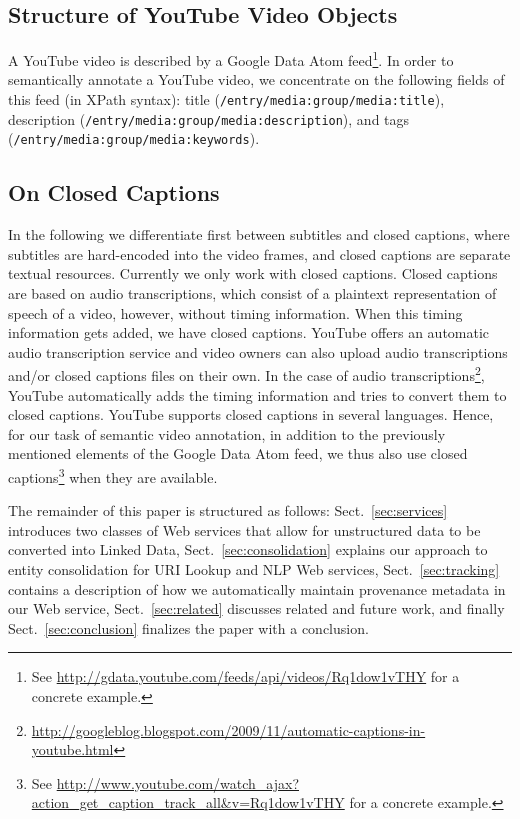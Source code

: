\documentclass{acm_proc_article-sp}
\begin{document}
\subsection{Structure of YouTube Video Objects}\label{sec:youtubestructure}
A YouTube video is described by a Google Data Atom feed\footnote{See \url{http://gdata.youtube.com/feeds/api/videos/Rq1dow1vTHY} for a concrete example.}. In order to semantically annotate a YouTube video, we concentrate on the following fields of this feed (in XPath syntax): title ({\tt /entry/media:group/media:title}), description ({\tt /entry/media:group/media:description}), and tags ({\tt /entry/media:group/media:keywords}).
\subsection{On Closed Captions}\label{sec:closedcaptions}
In the following we differentiate first between subtitles and closed captions, where subtitles are hard-encoded into the video frames, and closed captions are separate textual resources. Currently we only work with closed captions. Closed captions are based on audio transcriptions, which consist of a plaintext representation of speech of a video, however, without timing information. When this timing information gets added, we have closed captions. YouTube offers an automatic audio transcription service and video owners can also upload audio transcriptions and/or closed captions files on their own. In the case of audio transcriptions\footnote{\url{http://googleblog.blogspot.com/2009/11/automatic-captions-in-youtube.html}}, YouTube automatically adds the timing information and tries to convert them to closed captions. YouTube supports closed captions in several languages. Hence, for our task of semantic video annotation, in addition to the previously mentioned elements of the Google Data Atom feed, we thus also use closed captions\footnote{See \url{http://www.youtube.com/watch_ajax?action_get_caption_track_all&v=Rq1dow1vTHY} for a concrete example.} when they are available.

The remainder of this paper is structured as follows: Sect.~\ref{sec:services} introduces two classes of Web services that allow for unstructured data to be converted into Linked Data, Sect.~\ref{sec:consolidation} explains our approach to entity consolidation for URI Lookup and NLP Web services, Sect.~\ref{sec:tracking} contains a description of how we automatically maintain provenance metadata in our Web service, Sect.~\ref{sec:related} discusses related and future work, and finally Sect.~\ref{sec:conclusion} finalizes the paper with a conclusion.
\end{document}
